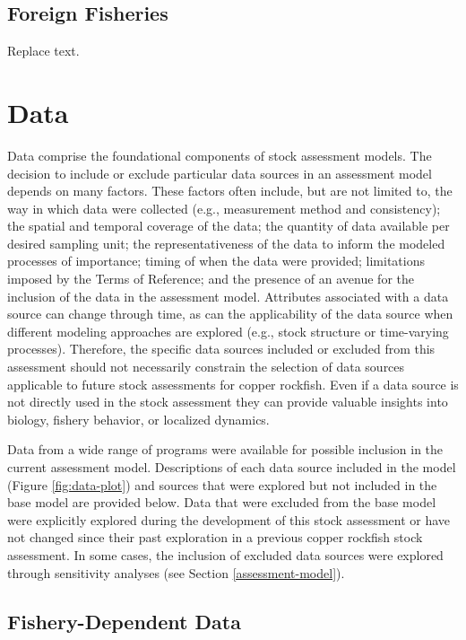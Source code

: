 \documentclass[11pt,
  english,
  letterpaper,
]{article}
\begin{document}
\hypertarget{foreign-fisheries}{%
\subsection{Foreign Fisheries}\label{foreign-fisheries}}

Replace text.

\hypertarget{data}{%
\section{Data}\label{data}}

Data comprise the foundational components of stock assessment models. The decision to include or exclude particular data sources in an assessment model depends on many factors. These factors often include, but are not limited to, the way in which data were collected (e.g., measurement method and consistency); the spatial and temporal coverage of the data; the quantity of data available per desired sampling unit; the representativeness of the data to inform the modeled processes of importance; timing of when the data were provided; limitations imposed by the Terms of Reference; and the presence of an avenue for the inclusion of the data in the assessment model. Attributes associated with a data source can change through time, as can the applicability of the data source when different modeling approaches are explored (e.g., stock structure or time-varying processes). Therefore, the specific data sources included or excluded from this assessment should not necessarily constrain the selection of data sources applicable to future stock assessments for copper rockfish. Even if a data source is not directly used in the stock assessment they can provide valuable insights into biology, fishery behavior, or localized dynamics.

Data from a wide range of programs were available for possible inclusion in the current assessment model. Descriptions of each data source included in the model (Figure \ref{fig:data-plot}) and sources that were explored but not included in the base model are provided below. Data that were excluded from the base model were explicitly explored during the development of this stock assessment or have not changed since their past exploration in a previous copper rockfish stock assessment. In some cases, the inclusion of excluded data sources were explored through sensitivity analyses (see Section \ref{assessment-model}).

\hypertarget{fishery-dependent-data}{%
\subsection{Fishery-Dependent Data}\label{fishery-dependent-data}}
\end{document}
